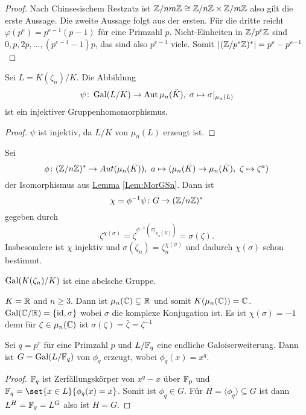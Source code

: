 \begin{proof}
    Nach Chinsesischem Restzatz ist $\mathbb{Z}/nm\mathbb{Z}\cong \mathbb{Z}/n\mathbb{Z}\times \mathbb{Z}/m\mathbb{Z}$ also gilt die erste Aussage. Die zweite Aussage folgt aus der ersten.
    Für die dritte reicht $\varphi(p^e)=p^{e-1}(p-1)$ für eine Primzahl $p$.
    Nicht-Einheiten in $\mathbb{Z}/p^e\mathbb{Z}$ sind $0,p,2p,\dots,(p^{e-1}-1)p$, das sind also $p^{e-1}$ viele. Somit $|(\mathbb{Z}/p^e\mathbb{Z})^*|=p^e-p^{e-1}$
\end{proof}
\begin{Satz}
    Sei $L=K(\zeta_n)/K$. Die Abbildung 
    $$\psi\colon\operatorname{Gal}(L/K)\to\operatorname{Aut}\mu_n(\bar K),\; \sigma\mapsto \sigma|_{\mu_n(L)}$$ ist ein injektiver Gruppenhomomorphismus.
\end{Satz}
\begin{proof}
    $\psi$ ist injektiv, da $L/K$ von $\mu_n(L)$ erzeugt ist.
\end{proof}
\begin{Kor}\label{Kor:ChiGal}
    Sei $$\phi\colon(\ZZ/n\ZZ)^*\to Aut(\mu_n(\bar K)),\ a\mapsto (\mu_n(\bar K)\to\mu_n(\bar K),\ \zeta\mapsto \zeta^a)$$ der Isomorphismus aus \hyperref[Lem:MorGSn]{Lemma} \ref{Lem:MorGSn}.
    Dann ist $$\chi=\phi^{-1}\psi\colon G\to (\mathbb{Z}/n\mathbb{Z})^* $$ gegeben durch $$\zeta^{\chi(\sigma)}=\zeta^{\phi^{-1}(\sigma|_{\mu_n(\bar K)})}=\sigma(\zeta).$$
    Insbesondere ist $\chi$ injektiv und $\sigma(\zeta_n)=\zeta_n^{\chi(\sigma)}$ und dadurch $\chi(\sigma)$ schon bestimmt.
\end{Kor}
\begin{Kor}
    $\operatorname{Gal}(K(\zeta_n)/K)$ ist eine abelsche Gruppe.
\end{Kor}
\begin{Bsp}
    $K=\mathbb{R}$ and $n\geq 3$. Dann ist $\mu_n(\mathbb{C})\subsetneq\mathbb{R}$ und somit $K(\mu_n(\mathbb{C}))=\mathbb{C}$.
    $\operatorname{Gal}(\mathbb{C}/\mathbb{R})=\{\mathrm{id},\sigma\}$ wobei $\sigma$ die komplexe Konjugation ist. Es ist $\chi(\sigma)=-1$ denn
    für $\zeta\in\mu_n(\mathbb{C})$ ist $\sigma(\zeta)=\bar\zeta=\zeta^{-1}$
\end{Bsp}
\begin{Satz}
    Sei $q=p^r$ für eine Primzahl $p$ und $L/\mathbb{F}_q$ eine endliche Galoiserweiterung. Dann ist $G=\operatorname{Gal}(L/\mathbb{F}_q)$ von $\phi_q$ erzeugt, wobei $\phi_q(x)=x^q$.
\end{Satz}
\begin{proof}
    $\mathbb{F}_q$ ist Zerfällungskörper von $x^q-x$ über $\mathbb{F}_p$ und
    $\FF_q=\set{x\in L}{ \phi_q(x)=x}$. Somit ist $\phi_q\in G$.
    Für $H=\langle \phi_q\rangle\subseteq G$ ist 
    dann $L^H=\mathbb{F}_q=L^G$ also ist $H=G$.
\end{proof}
